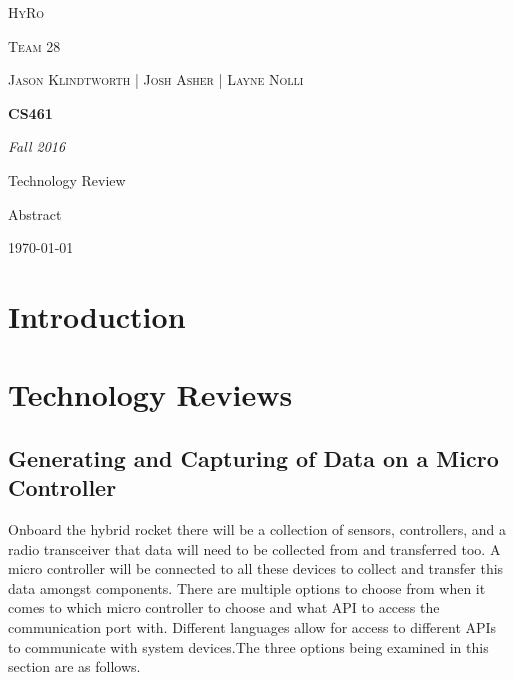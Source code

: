 \documentclass[10pt,draftclsnofoot,onecolumn]{IEEEtran}
\begin{document}
\begin{titlepage}
\centering
	{\scshape\LARGE HyRo \par}
	{\scshape\LARGE Team 28\par}
	\vspace{1cm}
	{\scshape\Large Jason Klindtworth  |  Josh Asher  |   Layne Nolli}
	\noindent\makebox[\linewidth]{\rule{17cm}{2pt}}
	\vspace{1cm}
	{\huge\bfseries CS461\par}
	\vspace{2cm}
	{\Large\itshape Fall 2016\par}
	\vspace{4cm}
	{\large Technology Review\par}
	\vspace{4cm}
	{\large Abstract\par}
	\vspace{1cm}
	\noindent\makebox[\linewidth]{\rule{17cm}{2pt}}

	\vfill

	{\large \today\par}
\end{titlepage}
\tableofcontents

\section{Introduction}


\section{Technology Reviews}
\subsection{Generating and Capturing of Data on a Micro Controller}
Onboard the hybrid rocket there will be a collection of sensors, controllers, and a radio transceiver that data will need to be collected from and transferred too. A micro controller will be connected to all these devices to collect and transfer this data amongst components. There are multiple options to choose from when it comes to which micro controller to choose and what API to access the communication port with. Different languages allow for access to different APIs to communicate with system devices.The three options being examined in this section are as follows. \\
\end{document}
